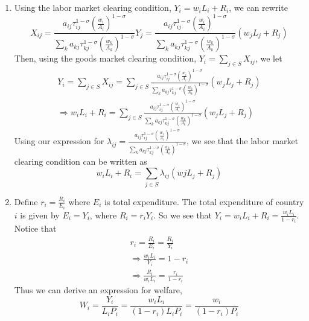 \documentclass{article}
\begin{document}
\begin{enumerate}
    
    \item Using the labor market clearing condition, $Y_i = w_i L_i+R_i$, we can rewrite
    \[
		X_{ij} = \frac{a_{ij}\tau_{ij}^{1-\sigma}\left(\frac{w_i}{A_i}\right)^{1-\sigma}}{\sum_{k}a_{kj}\tau_{kj}^{1-\sigma}\left(\frac{w_k}{A_k}\right)^{1-\sigma}}Y_{j} = \frac{a_{ij}\tau_{ij}^{1-\sigma}\left(\frac{w_i}{A_i}\right)^{1-\sigma}}{\sum_{k}a_{kj}\tau_{kj}^{1-\sigma}\left(\frac{w_k}{A_k}\right)^{1-\sigma}}(w_jL_j+R_j)
	\]
	Then, using the goods market clearing condition, $Y_i = \sum_{j \in S}X_{ij}$, we let
	\begin{gather*}
		Y_i = \sum_{j \in S}X_{ij} = \sum_{j \in S}\frac{a_{ij}\tau_{ij}^{1-\sigma}\left(\frac{w_i}{A_i}\right)^{1-\sigma}}{\sum_{k}a_{kj}\tau_{kj}^{1-\sigma}\left(\frac{w_k}{A_k}\right)^{1-\sigma}}(w_jL_j+R_j)\\
		\Rightarrow w_iL_i+R_i = \sum_{j \in S}\frac{a_{ij}\tau_{ij}^{1-\sigma}\left(\frac{w_i}{A_i}\right)^{1-\sigma}}{\sum_{k}a_{kj}\tau_{kj}^{1-\sigma}\left(\frac{w_k}{A_k}\right)^{1-\sigma}}(w_jL_j+R_j)
	\end{gather*}
	Using our expression for $\lambda_{ij} =  \frac{a_{ij}\tau_{ij}^{1-\sigma}\left(\frac{w_i}{A_i}\right)^{1-\sigma}}{\sum_{k}a_{kj}\tau_{kj}^{1-\sigma}\left(\frac{w_k}{A_k}\right)^{1-\sigma}}$, we  see that the labor market clearing condition can be written as
		\[
		w_iL_i+R_i = \sum_{j \in S} \lambda_{ij}(wjL_j+R_j)
		\]
		
	\item Define $r_{i} = \frac{R_{i}}{E_i}$ where $E_{i}$ is total expenditure. The total expenditure of country $i$ is given by $E_i = Y_i $, where $R_i = r_i Y_i$. So we see that $Y_i = w_iL_i+R_i= \frac{w_iL_i}{1-r_i}$. Notice that
	\begin{gather*}
		r_{i} = \frac{R_{i}}{E_i} = \frac{R_{i}}{Y_i}\\
		\Rightarrow \frac{w_iL_i}{Y_i} = 1-r_i\\
		\Rightarrow \frac{R_i}{w_{i}L_{i}} = \frac{r_i}{1-r_i}
	\end{gather*}
	Thus we can derive an expression for welfare, 
	\[
		W_{i} = \frac{Y_{i}}{L_{i}P_{i}} = \frac{w_{i}L_{i}}{(1-r_{i})L_{i}P_{i}}=\frac{w_{i}}{(1-r_{i})P_{i}}
	\]
	

\end{enumerate}
\end{document}

